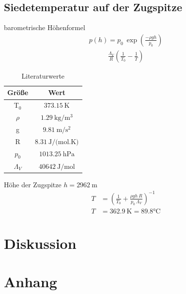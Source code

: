 \documentclass[12pt,a4paper,titlepage,headinclude,bibtotoc]{scrartcl}
\begin{document}
\subsection{Siedetemperatur auf der Zugspitze}
barometrische Höhenformel
\begin{align}
 p(h)=p_0~\exp{\left(\frac{-\rho g h}{p_0}\right)}
\end{align}
\begin{align*}
 \frac{\Lambda_V}{R}\left(\frac{1}{T_0}-\frac{1}{T}\right)
\end{align*}

\begin{table}[!htb]
 \centering
 \begin{tabular}{|c|c|}
  \hline
  Größe & Wert\\
  \hline
  T$_0$ & $373.15~\si{\kelvin}$\\
  $\rho$ & $1.29~\si{\kilo \gram/\meter^3}$\\
  g & $9.81~\si{\meter/\second^2}$\\
  R & $8.31~\si{\joule/(\mol.\kelvin)}$\\
  $p_0$ & $1013.25~\si{\hecto \pascal}$\\
  $\Lambda_V$ & $40642 ~\si{\joule/\mol}$\\
  \hline
 \end{tabular}
 \caption{Literaturwerte}
 \label{tab:litW}
\end{table}
Höhe der Zugspitze $h=2962~\si{\meter}$
\begin{align*}
 T &= \left(\frac{1}{T_0}+\frac{\rho g h~R}{p_0~\Lambda_V}\right)^{-1}\\
 T&=362.9~\si{\kelvin}=89.8\si{\celsius}
\end{align*}




\section{Diskussion}
\label{sec:diskussion}

\section{Anhang}



\end{document}
